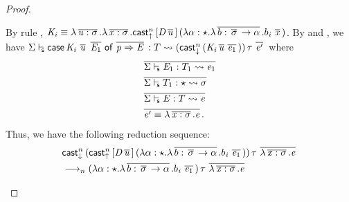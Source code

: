\begin{proof}
\begin{description}
        By rule , $\mathit{K_{\mathit{i}}}  \equiv  \lambda  \,\overline{  \mathit{u}  :  \sigma  }\,  .  \lambda  \,\overline{  \mathit{x}  :  \sigma  }\,  .  \mathsf{cast}_{\uparrow}^n \, [  \mathit{D}    \,\overline{  \mathit{u}  }\,  ] \,  (  \lambda  \alpha  :  \star  .  \lambda  \,\overline{  b  :  \,\overline{  \sigma  }\,  \rightarrow  \alpha  }\,  .  b_{\mathit{i}} \, \,\overline{  \mathit{x}  }\,  )$. By  and , we have $ \Sigma  \vdash_{\!\!\mathsf{s} }  \mathsf{case} \, \mathit{K_{\mathit{i}}} \, \,\overline{  \mathit{u}  }\, \, \,\overline{  \mathit{E_{{\mathrm{1}}}}  }\, \, \mathsf{of} \, \,\overline{  \mathit{p}  \Rightarrow  \mathit{E}  }\,  :  T   \rightsquigarrow   (  \mathsf{cast}_{\downarrow}^n \, (  \mathit{K_{\mathit{i}}}  \,\overline{  \mathit{u}  }\,  \,\overline{  \mathit{e_{{\mathrm{1}}}}  }\,  )  ) \, \tau \, \,\overline{  \mathit{e'}  }\, $ where
        \begin{align*}
                & \,\overline{   \Sigma  \vdash_{\!\!\mathsf{s} }  \mathit{E_{{\mathrm{1}}}}  :  T_{{\mathrm{1}}}   \rightsquigarrow   \mathit{e_{{\mathrm{1}}}}   }\, \\
                & \,\overline{   \Sigma  \vdash_{\!\!\mathsf{s} }  T_{{\mathrm{1}}}  :  \star   \rightsquigarrow   \sigma   }\, \\
                & \,\overline{   \Sigma  \vdash_{\!\!\mathsf{s} }  \mathit{E}  :  T   \rightsquigarrow   \mathit{e}   }\, \\
                & \,\overline{  \mathit{e'}  \equiv  \lambda  \,\overline{  \mathit{x}  :  \sigma  }\,  .  \mathit{e}  }\,.
        \end{align*}
        Thus, we have the following reduction sequence:
        \begin{align*}
            &\kw{cast}_{\downarrow}^n \, \ottsym{(}  \kw{cast}_{\uparrow}^n \, \ottsym{[}  \ottmv{D}    \,\overline{  \ottnt{u}  }\,  \ottsym{]} \,  \ottsym{(}  \lambda  \alpha  \ottsym{:}  \star  \ottsym{.}  \lambda  \,\overline{  b  \ottsym{:}  \,\overline{  \sigma  }\,  \rightarrow  \alpha  }\,  \ottsym{.}  b_{\ottmv{i}} \, \,\overline{  \ottnt{e_{{\mathrm{1}}}}  }\,  \ottsym{)}  \ottsym{)} \, \tau \, \,\overline{  \lambda  \,\overline{  \ottmv{x}  \ottsym{:}  \sigma  }\,  \ottsym{.}  \ottnt{e}  }\, \\
            & \longrightarrow_n   \ottsym{(}  \lambda  \alpha  \ottsym{:}  \star  \ottsym{.}  \lambda  \,\overline{  b  \ottsym{:}  \,\overline{  \sigma  }\,  \rightarrow  \alpha  }\,  \ottsym{.}  b_{\ottmv{i}} \, \,\overline{  \ottnt{e_{{\mathrm{1}}}}  }\,  \ottsym{)} \, \tau \, \,\overline{  \lambda  \,\overline{  \ottmv{x}  \ottsym{:}  \sigma  }\,  \ottsym{.}  \ottnt{e}  }\, \\

\end{align*}
\end{description}
\end{proof}
